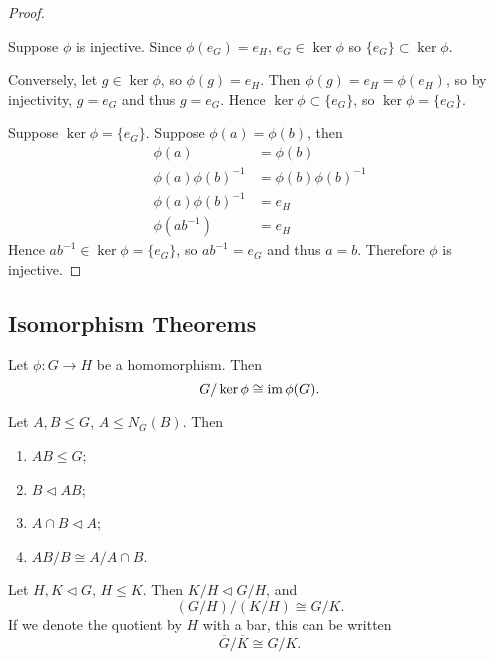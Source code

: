 \begin{proof} \

\fbox{$\implies$} Suppose $\phi$ is injective. Since $\phi(e_G)=e_H$, $e_G\in\ker\phi$ so $\{e_G\}\subset\ker\phi$. 

Conversely, let $g\in\ker\phi$, so $\phi(g)=e_H$. Then $\phi(g)=e_H=\phi(e_H)$, so by injectivity, $g=e_G$ and thus $g=e_G$. Hence $\ker\phi\subset\{e_G\}$, so $\ker\phi=\{e_G\}$.

\fbox{$\impliedby$} Suppose $\ker\phi=\{e_G\}$. Suppose $\phi(a)=\phi(b)$, then
\begin{align*}
\phi(a)&=\phi(b)\\
\phi(a)\phi(b)^{-1}&=\phi(b)\phi(b)^{-1}\\
\phi(a)\phi(b)^{-1}&=e_H\\
\phi(ab^{-1})&=e_H
\end{align*}
Hence $ab^{-1}\in\ker\phi=\{e_G\}$, so $ab^{-1}=e_G$ and thus $a=b$. Therefore $\phi$ is injective.
\end{proof}

\subsection{Isomorphism Theorems}
\begin{theorem}
Let $\phi:G\to H$ be a homomorphism. Then
\[G/\ker\phi\cong\operatorname{im}\phi(G).\]
\end{theorem}

\begin{theorem}
Let $A,B\le G$, $A\le N_G(B)$. Then
\begin{enumerate}[label=(\roman*)]
\item $AB\le G$;
\item $B\triangleleft AB$;
\item $A\cap B\triangleleft A$;
\item $AB/B\cong A/A\cap B$.
\end{enumerate}
\end{theorem}

\begin{theorem}
Let $H,K\triangleleft G$, $H\le K$. Then $K/H\triangleleft G/H$, and
\[(G/H)/(K/H)\cong G/K.\]
If we denote the quotient by $H$ with a bar, this can be written
\[\overline{G}/\overline{K}\cong G/K.\]
\end{theorem}

\begin{theorem}

\end{theorem}

